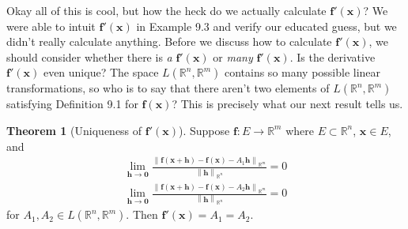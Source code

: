\documentclass{article}
\newcommand{\R}{\mathbb{R}}
\newcommand{\x}{\mathbf{x}}
\newcommand{\f}{\mathbf{f}}
\newcommand{\ze}{\mathbf{0}}
\newcommand{\norm}[1]{\left\lVert#1\right\rVert}
\theoremstyle{definition}
\newtheorem{theorem}{Theorem}[section]
\begin{document}
Okay all of this is cool, but how the heck do we actually calculate $ \f'(\x) $? We were able to intuit $ \f'(\x) $ in Example 9.3 and verify our educated guess, but we didn't really calculate anything. Before we discuss how to calculate $ \f'(\x) $, we should consider whether there is \textit{a} $ \f'(\x) $ or \textit{many} $ \f'(\x) $. Is the derivative $ \f'(\x) $ even unique? The space $ L(\R^n,\R^m) $ contains so many possible linear transformations, so who is to say that there aren't two elements of $ L(\R^n,\R^m) $ satisfying Definition 9.1 for $ \f(\x) $? This is precisely what our next result tells us. 
\begin{theorem}[Uniqueness of $ \f'(\x) $]
	Suppose $ \f:E\to\R^m $ where $ E\subset \R^n $, $ \x \in E $, and \begin{align*}
		\lim\limits_{\mathbf h\to \ze}\frac{\norm{\f(\x+\mathbf h) - \f(\x)-A_1\mathbf{h}}_{\R^m}}{\norm{\mathbf h}_{\R^n}} = 0\\
		\lim\limits_{\mathbf h\to \ze}\frac{\norm{\f(\x+\mathbf h) - \f(\x)-A_2\mathbf{h}}_{\R^m}}{\norm{\mathbf h}_{\R^n}} = 0
	\end{align*}
for $ A_1,A_2 \in L(\R^n,\R^m) $. Then $ \f'(\x) = A_1 = A_2 $. 
\end{theorem}
\end{document}
